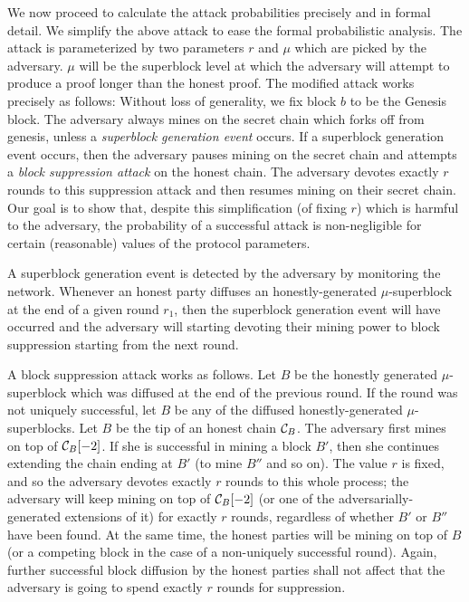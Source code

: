 We now proceed to calculate the attack probabilities precisely and in formal
detail.
We simplify the above attack
to ease the formal probabilistic analysis. The attack is parameterized by two
parameters $r$ and $\mu$ which are picked by the adversary. $\mu$ will be the
superblock level at which the adversary will attempt to produce a proof longer
than the honest proof. The modified attack works precisely as follows: Without
loss of generality, we fix block $b$ to be the Genesis block. The adversary
always mines on the secret chain which forks off from genesis, unless a
\textit{superblock generation event} occurs. If a superblock generation event
occurs, then the adversary pauses mining on the secret chain and attempts a
\textit{block suppression attack} on the honest chain. The adversary devotes
exactly $r$ rounds to this suppression attack and then resumes mining on their
secret chain. Our goal is to show that, despite this simplification (of fixing
$r$) which is harmful to the adversary, the probability of a successful attack
is non-negligible for certain (reasonable) values of the protocol parameters.

A superblock generation event is detected by the adversary by monitoring the
network. Whenever an honest party diffuses an honestly-generated
$\mu$-superblock at the end of a given round $r_1$, then the superblock
generation event will have occurred and the adversary will starting devoting
their mining power to block suppression starting from the next round.

A block suppression attack works as follows. Let $B$ be the honestly generated
$\mu$-superblock which was diffused at the end of the previous round. If the
round was not uniquely successful, let $B$ be any of the diffused
honestly-generated $\mu$-superblocks. Let $B$ be the tip of an honest chain
$\mathcal{C}_B$. The adversary first mines on top of $\mathcal{C}_B[-2]$. If she is
successful in mining a block $B'$, then she continues extending the chain ending
at $B'$ (to mine $B''$ and so on). The value $r$ is fixed, and so the adversary
devotes exactly $r$ rounds to this whole process; the adversary will keep mining
on top of $\mathcal{C}_B[-2]$ (or one of the adversarially-generated extensions of
it) for exactly $r$ rounds, regardless of whether $B'$ or $B''$ have been found.
At the same time, the honest parties will be mining on top of $B$ (or a
competing block in the case of a non-uniquely successful round). Again, further
successful block diffusion by the honest parties shall not affect that the
adversary is going to spend exactly $r$ rounds for suppression.

